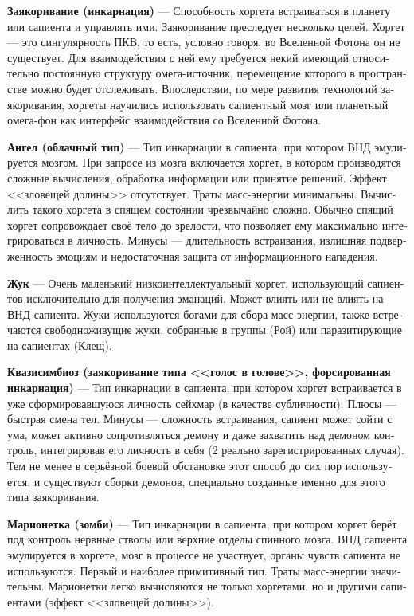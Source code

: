 \documentclass[a4paper,12pt,fleqn]{book}\usepackage{cooltooltips}\usepackage{polyglossia}\setdefaultlanguage[babelshorthands=true]{russian}\setotherlanguage{english}\defaultfontfeatures{Ligatures=TeX,Mapping=tex-text} \usepackage{xcolor}\definecolor{lightgray}{HTML}{bbbbbb}\color{lightgray}\newcommand{\ml}[3]{\textenglish{\textcolor{black}{#3}}}
\newcommand{\asterism}{\vspace{1em}{\centering\Large\bfseries$\ast~\ast~\ast$\par}\vspace{1em}}
\newcommand{\theterm}[3]{\textbf{\hypertarget{#1}{#2}} --- #3}
\begin{document}
\theterm{incarnation}
{Заякоривание (инкарнация)}
{Способность хоргета встраиваться в планету или сапиента и управлять ими.
Заякоривание преследует несколько целей.
Хоргет --- это сингулярность ПКВ, то есть, условно говоря, во Вселенной Фотона он не существует.
Для взаимодействия с ней ему требуется некий имеющий относительно постоянную структуру омега-источник, перемещение которого в пространстве можно будет отслеживать.
Впоследствии, по мере развития технологий заякоривания, хоргеты научились использовать сапиентный мозг или планетный омега-фон как интерфейс взаимодействия со Вселенной Фотона.}

\asterism

\theterm{anjel}
{Ангел (облачный тип)}
{Тип инкарнации в сапиента, при котором ВНД эмулируется мозгом.
При запросе из мозга включается хоргет, в котором производятся сложные вычисления, обработка информации или принятие решений.
Эффект <<зловещей долины>> отсутствует.
Траты масс-энергии минимальны.
Вычислить такого хоргета в спящем состоянии чрезвычайно сложно.
Обычно спящий хоргет сопровождает своё тело до зрелости, что позволяет ему максимально интегрироваться в личность.
Минусы --- длительность встраивания, излишняя подверженность эмоциям и недостаточная защита от информационного нападения.}

\theterm{bug}
{Жук}
{Очень маленький низкоинтеллектуальный хоргет, использующий сапиентов исключительно для получения эманаций.
Может влиять или не влиять на ВНД сапиента.
Жуки используются богами для сбора масс-энергии, также встречаются свободноживущие жуки, собранные в группы (Рой) или паразитирующие на сапиентах (Клещ).}

\theterm{quasisimbiosis}
{Квазисимбиоз (заякоривание типа <<голос в голове>>, форсированная инкарнация)}
{Тип инкарнации в сапиента, при котором хоргет встраивается в уже сформировавшуюся личность сейхмар (в качестве субличности).
Плюсы --- быстрая смена тел.
Минусы --- сложность встраивания, сапиент может сойти с ума, может активно сопротивляться демону и даже захватить над демоном контроль, интегрировав его личность в себя (2 реально зарегистрированных случая).
Тем не менее в серьёзной боевой обстановке этот способ до сих пор используется, и существуют сборки демонов, специально созданные именно для этого типа заякоривания.}

\theterm{zombie}
{Марионетка (зомби)}
{Тип инкарнации в сапиента, при котором хоргет берёт под контроль нервные стволы или верхние отделы спинного мозга.
ВНД сапиента эмулируется в хоргете, мозг в процессе не участвует, органы чувств сапиента не используются.
Первый и наиболее примитивный тип.
Траты масс-энергии значительны.
Марионетки легко вычисляются не только хоргетами, но и другими сапиентами (эффект <<зловещей долины>>).}
\end{document}
